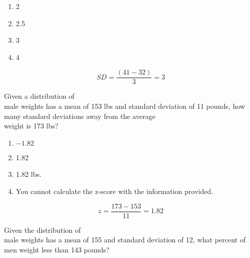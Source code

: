 \documentclass[11pt]{book}\usepackage[]{graphicx}\usepackage[]{color}
\begin{document}
\begin{exercises}
\begin{exercise}
	  \begin{enumerate}
	  \item 2
	  \item 2.5
	  \item 3
	  \item 4
	  \end{enumerate}
	  
    
	\end{exercise}
	\begin{solution}   %
	
	  \begin{equation}
	    SD = \frac{(41 - 32)}{3} = 3
	  \end{equation}
	  
	\end{solution}

  \begin{exercise} %

    Given a distribution of \\ male weights  has a mean of 153 lbs and standard deviation of 11 pounds, how many standard deviations away from the average \\ weight is 173 lbs?

	  \begin{enumerate}
	  \item $-1.82$
	  \item 1.82
	  \item 1.82 lbs.
	  \item You cannot calculate the z-score with the information provided.
	  \end{enumerate}

    
	\end{exercise}
	\begin{solution}   %
	
	  \begin{equation*}
	    z = \frac{173 - 153}{11} = 1.82
	  \end{equation*}
	  
	\end{solution}

  \begin{exercise} %

    Given the distribution of \\ male weights has a mean of 155 and standard deviation of 12, what percent
of men weight less than 143 pounds?


\end{exercise}
\end{exercises}
\end{document}
